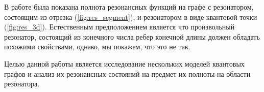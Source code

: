 В работе \cite{spectralpavlov16} была показана полнота резонансных функций на графе с резонатором, состоящим из отрезка (\autoref{fig:res_segment}), и резонатором в виде квантовой точки (\autoref{fig:res_3d}). Естественным предположением является что произвольный резонатор, состоящий из конечного числа ребер конечной длины должен обладать похожими свойствами, однако, мы покажем, что это не так.

Целью данной работы является исследование нескольких моделей квантовых графов и анализ их резонансных состояний на предмет их полноты на области резонатора.
